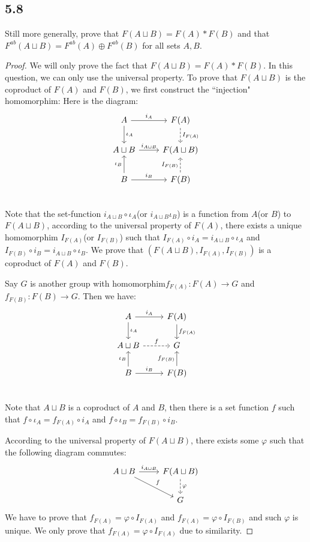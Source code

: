 \documentclass[a4paper, pdf, 12pt]{article}
\begin{document}
\subsection*{5.8}
Still more generally, prove that $F(A\sqcup B) = F(A)*F(B)$ and that $F^{ab}(A\sqcup B) =
  F^{ab}(A) \oplus F^{ab}(B)$ for all sets $A, B$.
\begin{proof}
  We will only prove the fact that $F(A\sqcup B) = F(A) * F(B)$. In this question, we can only use the universal property.
  To prove that $F(A\sqcup B)$ is the coproduct of $F(A)$ and $F(B)$, we first construct the ``injection" homomorphim:
  Here is the diagram:
  $$
    \begin{tikzcd}
      A \ar[r, "i_{A}"] \ar[d, "\iota_{A}"] & F(A) \ar[d, dashed, "I_{F(A)}"]\\
      A\sqcup B \ar[r, "i_{A\sqcup B}"] & F(A\sqcup B) \\
      B \ar[r, "i_{B}"] \ar[u, "\iota_{B}"] & F(B) \ar[u, dashed, "I_{F(B)}"]\\
    \end{tikzcd}
  $$
  Note that the set-function $i_{A\sqcup B}\circ\iota_{A}$(or $i_{A\sqcup B}\iota_{B}$) is a function from $A$(or $B$) to $F(A\sqcup B)$,
  according to the universal property of $F(A)$, there exists a unique homomorphim $I_{F(A)}$(or $I_{F(B)}$) such that
  $I_{F(A)}\circ i_{A} = i_{A\sqcup B}\circ \iota_{A}$ and $I_{F(B)}\circ i_{B} = i_{A\sqcup B}\circ \iota_{B}$. We prove that
  $(F(A\sqcup B), I_{F(A)}, I_{F(B)})$ is a coproduct of $F(A)$ and $F(B)$.

  Say $G$ is another group with homomorphim$f_{F(A)}: F(A)\rightarrow G$ and $f_{F(B)}: F(B)\rightarrow G$. Then we have:
  $$
    \begin{tikzcd}
      A \ar[r, "i_{A}"] \ar[d, "\iota_{A}"] & F(A) \ar[d, "f_{F(A)}"]\\
      A\sqcup B \ar[r, dashed, "f"] & G \\
      B \ar[r, "i_{B}"] \ar[u, "\iota_{B}"] & F(B) \ar[u, "f_{F(B)}"]\\
    \end{tikzcd}
  $$
  Note that $A\sqcup B$ is a coproduct of $A$ and $B$, then there is a set function $f$ such that $f\circ \iota_{A} = f_{F(A)}\circ i_{A}$ and
  $f\circ \iota_{B} = f_{F(B)}\circ i_{B}$.

  According to the universal property of $F(A\sqcup B)$, there exists some $\varphi$ such that the following diagram commutes:
  $$
    \begin{tikzcd}
      A\sqcup B \ar[r, "i_{A\sqcup B}"] \ar[rd, "f"] & F(A\sqcup B) \ar[d, dashed, "\varphi"]\\
      & G
    \end{tikzcd}
  $$
  We have to prove that $f_{F(A)} = \varphi \circ I_{F(A)}$ and $f_{F(A)} = \varphi \circ I_{F(B)}$ and such $\varphi$ is unique.
  We only prove that $f_{F(A)} = \varphi \circ I_{F(A)}$ due to similarity.


\end{proof}
\end{document}

